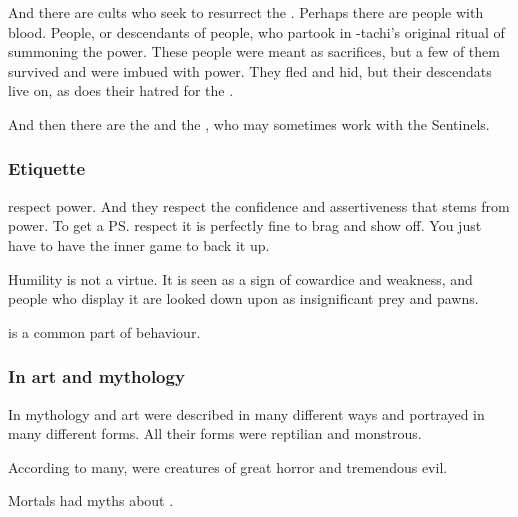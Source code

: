 And there are cults who seek to resurrect the \xzaishanns. Perhaps there are people with \xzaishannic{} blood. People, or descendants of people, who partook in \Tiamat-tachi's original ritual of summoning the \xzaishannic{} power. These people were meant as sacrifices, but a few of them survived and were imbued with \xzaishannic{} power. They fled and hid, but their descendats live on, as does their hatred for the \draecchonosh. 

And then there are the \ophidians{} and the \nagae{}, who may sometimes work with the Sentinels. 









\subsubsection{Etiquette}
\Dragons{} respect power. 
And they respect the confidence and assertiveness that stems from power. 
To get a \ps{\dragon}{} respect it is perfectly fine to brag and show off. 
You just have to have the inner game to back it up. 

Humility is not a virtue. 
It is seen as a sign of cowardice and weakness, and people who display it are looked down upon as insignificant prey and pawns. 

 is a common part of \Draconic{} behaviour. 





\subsubsection{In art and mythology}
In mythology and art \dragons were described in many different ways and portrayed in many different forms. 
All their forms were reptilian and monstrous. 

According to many, \dragons were creatures of great horror and tremendous evil. 

Mortals had myths about \dragons. 


